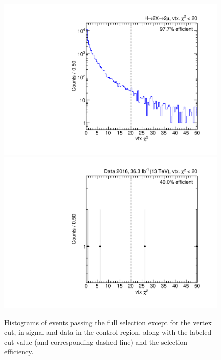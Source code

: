 \begin{figure}[p]
  \centering
  \includegraphics[width=\DSquareWidth]{figures/displaced/NM1_2Mu2J_vtxChi2.pdf}
  \hspace*{-2em}
  \includegraphics[width=\DSquareWidth]{figures/displaced/NM1_Data_vtxChi2.pdf}
  \caption[Histograms of events passing the full selection except for the vertex \chisq cut in \twoMu signal and data.]{Histograms of events passing the full selection except for the vertex \chisq cut, in  \twoMu signal and  data in the control region, along with the labeled cut value (and corresponding dashed line) and the selection efficiency.}
  \label{fig:dd:NM1_vtxChi2}
\end{figure}

